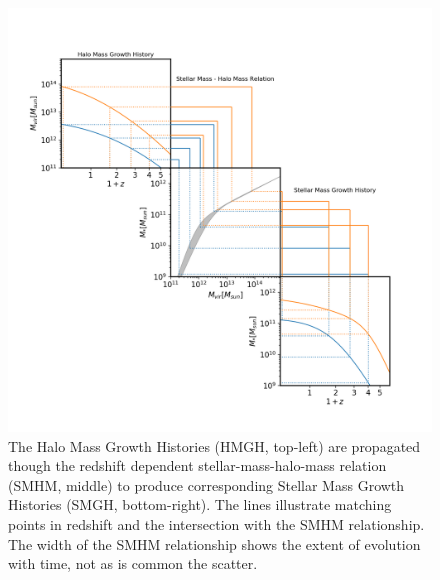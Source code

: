 
\begin{figure}[h]
	\centering
	\includegraphics[width = \linewidth]{Figures/Chapter2/HMGH_to_SMGH.png}
    \caption{The Halo Mass Growth Histories (HMGH, top-left) are propagated though the redshift dependent stellar-mass-halo-mass relation (SMHM, middle) to produce corresponding Stellar Mass Growth Histories (SMGH, bottom-right). The lines illustrate matching points in redshift and the intersection with the SMHM relationship. The width of the SMHM relationship shows the extent of evolution with time, not as is common the scatter.}
	\label{fig:Cont_Eqn}
\end{figure}

